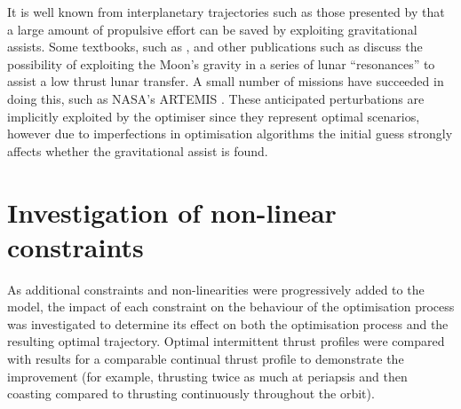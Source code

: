 
It is well known from interplanetary trajectories such as those presented by \textcite{Petukhov2007} that a large amount of propulsive effort can be saved by exploiting gravitational assists. Some textbooks, such as \textcite{Kemble2006}, and other publications such as \textcite{Letterio_thesis} discuss the possibility of exploiting the Moon's gravity in a series of lunar \enquote{resonances} to assist a low thrust lunar transfer. A small number of missions have succeeded in doing this, such as NASA's ARTEMIS \parencite{Angelopoulos2011, Sweetser2011}. These anticipated perturbations are implicitly exploited by the optimiser since they represent optimal scenarios, however due to imperfections in optimisation algorithms the initial guess strongly affects whether the gravitational assist is found.

\section{Investigation of non-linear constraints} \label{sec:Constraint-objective}

As additional constraints and non-linearities were progressively added to the model, the impact of each constraint on the behaviour of the optimisation process was investigated to determine its effect on both the optimisation process and the resulting optimal trajectory. Optimal intermittent thrust profiles were compared with results for a comparable continual thrust profile to demonstrate the improvement (for example, thrusting twice as much at periapsis and then coasting compared to thrusting continuously throughout the orbit). 

